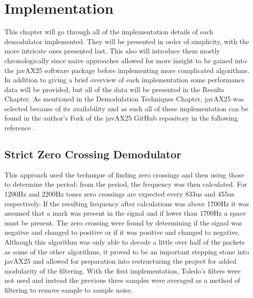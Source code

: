 \chapter{Implementation}

This chapter will go through all of the implementation details of each demodulator implemented. They will be presented in order of simplicity, with the more intricate ones presented last. This also will introduce them mostly chronologically since naive approaches allowed for more insight to be gained into the javAX25 software package before implementing more complicated algorithms. In addition to giving a brief overview of each implementation some performance data will be provided, but all of the data will be presented in the Results Chapter. As mentioned in the Demodulation Techniques Chapter, javAX25 was selected because of its availability and as such all of these implementation can be found in the author's Fork of the javAX25 GitHub repository in the following reference \cite{myJavAX25}. 

\section{Strict Zero Crossing Demodulator}
This approach used the technique of finding zero crossings and then using those to determine the period; from the period, the frequency was then calculated. For 1200Hz and 2200Hz tones zero crossings are expected every 833us and 455us respectively. If the resulting frequency after calculations was above 1700Hz it was assumed that a mark was present in the signal and if lower than 1700Hz a space must be present. The zero crossing were found by determining if the signal was negative and changed to positive or if it was positive and changed to negative. Although this algorithm was only able to decode a little over half of the packets as some of the other algorithms, it proved to be an important stepping stone into javAX25 and allowed for preparation into restructuring the project for added modularity of the filtering. With the first implementation, Toledo's filters were not used and instead the previous three samples were averaged as a method of filtering to remove sample to sample noise.

